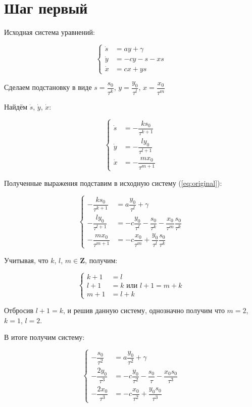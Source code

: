 \section{Шаг первый}

Исходная система уравнений:

\begin{equation}
\label{eq:original}
	\left\{
		\begin{aligned}
			\dot s &= ay + \gamma \\
			\dot y &= -cy -s -xs \\
			\dot x &= cx + ys
		\end{aligned}
	\right.
\end{equation}

Сделаем подстановку в виде $ s = \dfrac{s_0}{\tau^k} $, $ y = \dfrac{y_0}{\tau^l} $, $ x = \dfrac{x_0}{\tau^m} $

Найдём $ \dot s $, $ \dot y $, $ \dot x $:

$$
	\left\{
		\begin{aligned}
			\dot s &= -\dfrac{ks_0}{\tau^{k+1}} \\
			\dot y &= -\dfrac{ly_0}{\tau^{l+1}} \\
			\dot x &= -\dfrac{mx_0}{\tau^{m+1}} 
		\end{aligned}
	\right.
$$

Полученные выражения подставим в исходную систему (\ref{eq:original}):

\begin{equation}
\label{eq:step1}
	\left\{
		\begin{aligned}
			-\dfrac{ks_0}{\tau^{k+1}} &= a \dfrac{y_0}{\tau^l} + \gamma \\
			-\dfrac{ly_0}{\tau^{l+1}} &= -c \dfrac{y_0}{\tau^l} - \dfrac{s_0}{\tau^k} - \dfrac{x_0}{\tau^m} \dfrac{s_0}{\tau^k} \\
			-\dfrac{mx_0}{\tau^{m+1}} &= -c \dfrac{x_0}{\tau^m} + \dfrac{y_0}{\tau^l} \dfrac{s_0}{\tau^k}
		\end{aligned}
	\right.
\end{equation}

Учитывая, что $ k $, $ l $, $ m \in \textbf{Z} $, получим:
 
$$
	\left\{
		\begin{aligned}
			k + 1 &= l \\
			l + 1 &= k \text{  или  } l + 1 = m + k \\
			m + 1 &= l + k 
		\end{aligned}
	\right.
$$

Отбросив $ l + 1 = k $, и решив данную систему, однозначно получим что $ m = 2 $, $ k = 1 $, $ l = 2 $.

В итоге получим систему:

\begin{equation}
\label{eq:step1_results}
	\left\{
		\begin{aligned}
			-\dfrac{s_0}{\tau^2} &= a \dfrac{y_0}{\tau^2} + \gamma \\
			-\dfrac{2y_0}{\tau^3} &= -c \dfrac{y_0}{\tau^2} - \dfrac{s_0}{\tau} - \dfrac{x_0 s_0}{\tau^3} \\
			-\dfrac{2x_0}{\tau^{3}} &= -c \dfrac{x_0}{\tau^2} + \dfrac{y_0 s_0}{\tau^3}
		\end{aligned}
	\right.
\end{equation}